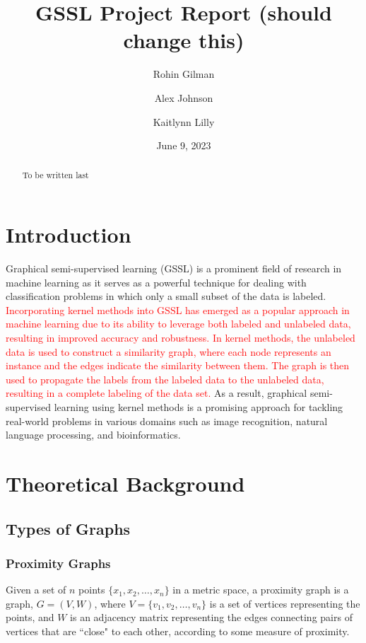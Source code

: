 \documentclass[12pt]{amsart}
\title{GSSL Project Report (should change this)}
\author{Rohin Gilman \and Alex Johnson \and Kaitlynn Lilly}
\date{June 9, 2023}
\begin{document}
\begin{abstract}
	To be written last
\end{abstract}

\maketitle

\section{Introduction} 
Graphical semi-supervised learning (GSSL) is a prominent field of research in machine learning as it serves as a powerful technique for dealing with classification problems in which only a small subset of the data is labeled. \textcolor{red}{Incorporating kernel methods into GSSL has emerged as a popular approach in machine learning due to its ability to leverage both labeled and unlabeled data, resulting in improved accuracy and robustness. In kernel methods, the unlabeled data is used to construct a similarity graph, where each node represents an instance and the edges indicate the similarity between them. The graph is then used to propagate the labels from the labeled data to the unlabeled data, resulting in a complete labeling of the data set.} As a result, graphical semi-supervised learning using kernel methods is a promising approach for tackling real-world problems in various domains such as image recognition, natural language processing, and bioinformatics.

\section{Theoretical Background}

\subsection{Types of Graphs}
\subsubsection{Proximity Graphs}
Given a set of $n$ points $\{x_1, x_2, \dots, x_n\}$ in a metric space, a proximity graph is a graph, $G = (V, W)$, where $V = \{v_1, v_2, \dots, v_n\}$ is a set of vertices representing the points, and $W$ is an adjacency matrix representing the edges connecting pairs of vertices that are ``close" to each other, according to some measure of proximity.
\end{document}
